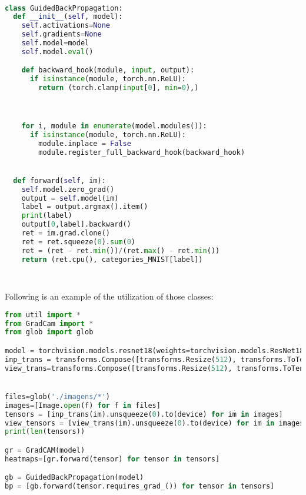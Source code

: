 \begin{program}
    \centering
    \label{code:gbp_class}
    \begin{lstlisting}[language=Python, style=wider]
        

class GuidedBackPropagation:
  def __init__(self, model):
    self.activations=None
    self.gradients=None
    self.model=model
    self.model.eval()

    def backward_hook(module, input, output):
      if isinstance(module, torch.nn.ReLU):
        return (torch.clamp(input[0], min=0),)



    for i, module in enumerate(model.modules()):
      if isinstance(module, torch.nn.ReLU):
        module.inplace = False
        module.register_full_backward_hook(backward_hook)


  def forward(self, im):
    self.model.zero_grad()
    output = self.model(im)
    label = output.argmax().item()
    print(label)
    output[0,label].backward()
    ret = im.grad.clone()
    ret = ret.squeeze(0).sum(0)
    ret = (ret - ret.min())/(ret.max() - ret.min())
    return (ret.cpu(), categories_MNIST[label])

    
    \end{lstlisting}

    \caption{GradCAM Class}

    
\end{program}

Following is an example of the utilization of those classes:

\begin{program}
    \centering
    \label{code:using_gc_gbp}
    \begin{lstlisting}[language=Python, style=wider]
from util import *
from GradCam import *
from glob import glob

model = torchvision.models.resnet18(weights=torchvision.models.ResNet18_Weights.IMAGENET1K_V1).to(device).eval()
inp_trans = transforms.Compose([transforms.Resize(512), transforms.ToTensor(), transforms.Normalize(mean=[0.485, 0.456, 0.406], std=[0.229, 0.224, 0.225]),])
view_trans=transforms.Compose([transforms.Resize(512), transforms.ToTensor()])


files=glob('./imagens/*')
images=[Image.open(f) for f in files]
tensors = [inp_trans(im).unsqueeze(0).to(device) for im in images]
view_tensors = [view_trans(im).unsqueeze(0).to(device) for im in images]
print(len(tensors))

gr = GradCAM(model)
heatmaps=[gr.forward(tensor) for tensor in tensors]

gb = GuidedBackPropagation(model)
bp = [gb.forward(tensor.requires_grad_()) for tensor in tensors]

      
    \end{lstlisting}

    \caption{Utilization of the classes}

    
\end{program}

